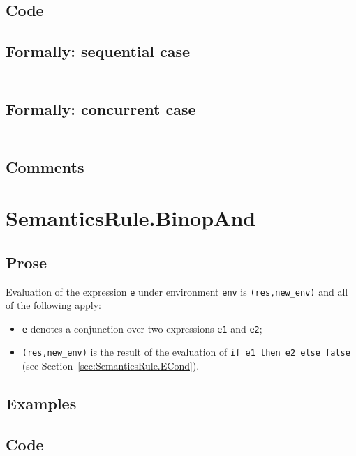 \documentclass{book}
\begin{document}
  \subsection{Code}

  \subsection{Formally: sequential case}
  \begin{align}
  \end{align} 

  \subsection{Formally: concurrent case}
  \begin{align}
  \end{align} 

  \subsection{Comments}

\section{SemanticsRule.BinopAnd \label{sec:SemanticsRule.BinopAnd}}

  \subsection{Prose}

  Evaluation of the expression \texttt{e} under environment \texttt{env} is
  \texttt{(res,new\_env)} and all of the following apply:
  \begin{itemize}
  \item \texttt{e} denotes a conjunction over two expressions \texttt{e1} and \texttt{e2};
  \item \texttt{(res,new\_env)} is the result of the evaluation of \texttt{if
e1 then e2 else false} (see Section~\ref{sec:SemanticsRule.ECond}).
  \end{itemize}

  \subsection{Examples}

  \subsection{Code}
\end{document}
